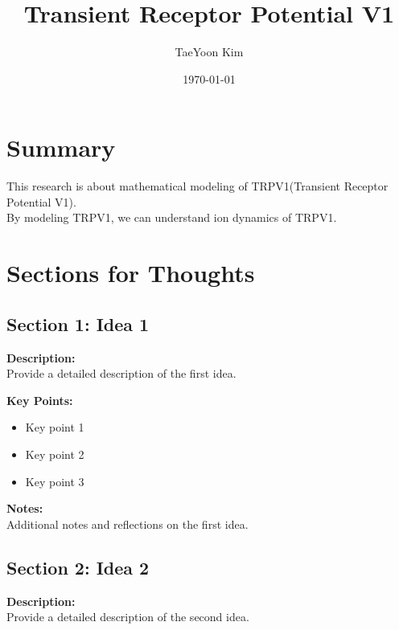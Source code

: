 \documentclass[a4paper, 12pt]{article}
\title{Transient Receptor Potential V1}
\author{TaeYoon Kim}
\date{\today}
\begin{document}
\maketitle

\section*{Summary}
\noindent
This research is about mathematical modeling of TRPV1(Transient Receptor Potential V1).\\
By modeling TRPV1, we can understand ion dynamics of TRPV1.
\vspace{1cm}

\section*{Sections for Thoughts}

\subsection*{Section 1: Idea 1}
\noindent
\textbf{Description:} \\
Provide a detailed description of the first idea.

\vspace{0.5cm}

\noindent
\textbf{Key Points:}
\begin{itemize}
    \item Key point 1
    \item Key point 2
    \item Key point 3
\end{itemize}

\vspace{0.5cm}

\noindent
\textbf{Notes:} \\
Additional notes and reflections on the first idea.

\vspace{1cm}

\subsection*{Section 2: Idea 2}
\noindent
\textbf{Description:} \\
Provide a detailed description of the second idea.

\vspace{0.5cm}
\end{document}
